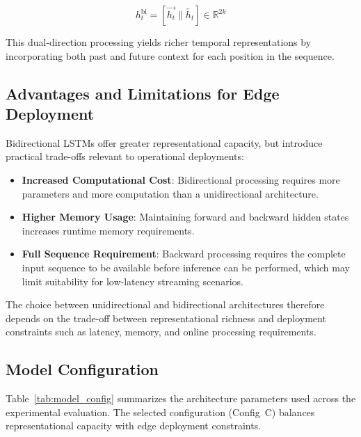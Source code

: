 \begin{equation}
    h_t^{\text{bi}} = [\overrightarrow{h_t} \| \overleftarrow{h_t}]
    \in \mathbb{R}^{2k}
    \label{eq:bilstm}
\end{equation}

This dual-direction processing yields richer temporal representations by incorporating
both past and future context for each position in the sequence.

\subsection{Advantages and Limitations for Edge Deployment}
\label{subsec:bilstm_tradeoffs}

Bidirectional LSTMs offer greater representational capacity, but introduce practical
trade-offs relevant to operational deployments:

\begin{itemize}
    \item \textbf{Increased Computational Cost}: Bidirectional processing requires more
    parameters and more computation than a unidirectional architecture.

    \item \textbf{Higher Memory Usage}: Maintaining forward and backward hidden states
    increases runtime memory requirements.

    \item \textbf{Full Sequence Requirement}: Backward processing requires the complete
    input sequence to be available before inference can be performed, which may limit
    suitability for low-latency streaming scenarios.
\end{itemize}

The choice between unidirectional and bidirectional architectures therefore depends on
the trade-off between representational richness and deployment constraints such as
latency, memory, and online processing requirements.

\subsection{Model Configuration}
\label{subsec:model_config}

Table~\ref{tab:model_config} summarizes the architecture parameters used across
the experimental evaluation. The selected configuration (Config~C) balances
representational capacity with edge deployment constraints.

